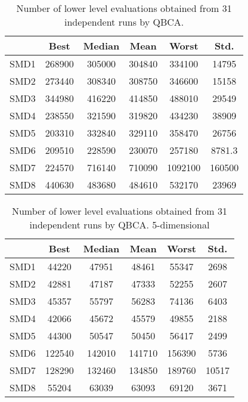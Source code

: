 \documentclass[conference]{IEEEtran}
\theoremstyle{definition}
\begin{document}
\begin{table}[htbp]
    \caption{Number of lower level evaluations obtained from 31 independent runs by QBCA.}
    \label{tab:ll-evals}
    \centering
    \begin{tabular}{cccccc}
        \hline
        & Best &  Median &  Mean &  Worst &  Std. \\ \hline
        SMD1 & 268900 & 305000 & 304840 & 334100 & 14795 \\ \hline 
        SMD2 & 273440 & 308340 & 308750 & 346600 & 15158 \\ \hline 
        SMD3 & 344980 & 416220 & 414850 & 488010 & 29549 \\ \hline 
        SMD4 & 238550 & 321590 & 319820 & 434230 & 38909 \\ \hline 
        SMD5 & 203310 & 332840 & 329110 & 358470 & 26756 \\ \hline 
        SMD6 & 209510 & 228590 & 230070 & 257180 & 8781.3 \\ \hline 
        SMD7 & 224570 & 716140 & 710090 & 1092100 & 160500 \\ \hline 
        SMD8 & 440630 & 483680 & 484610 & 532170 & 23969 \\ \hline 
    \end{tabular}
\end{table}

\begin{table}[htbp]
    \caption{Number of lower level evaluations obtained from 31 independent runs by QBCA. 5-dimensional}
    \label{tab:ll-evals-5}
    \centering
    \begin{tabular}{cccccc}
        \hline
            & Best &  Median &  Mean &  Worst &  Std. \\ \hline
        SMD1 & 44220 & 47951 & 48461 & 55347 & 2698 \\ \hline 
        SMD2 & 42881 & 47187 & 47333 & 52255 & 2607 \\ \hline 
        SMD3 & 45357 & 55797 & 56283 & 74136 & 6403 \\ \hline 
        SMD4 & 42066 & 45672 & 45579 & 49855 & 2188 \\ \hline 
        SMD5 & 44300 & 50547 & 50450 & 56417 & 2499 \\ \hline 
        SMD6 & 122540 & 142010 & 141710 & 156390 & 5736 \\ \hline 
        SMD7 & 128290 & 132460 & 134850 & 189760 & 10517 \\ \hline 
        SMD8 & 55204 & 63039 & 63093 & 69120 & 3671 \\ \hline 
    \end{tabular}
\end{table}
\end{document}

